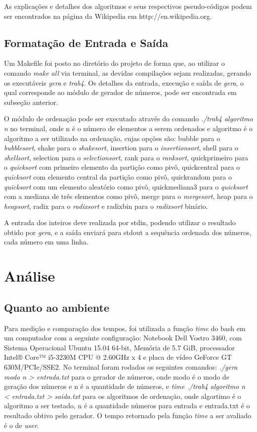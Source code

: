\documentclass[
	article,			%
	11pt,				%
	oneside,			%
	a4paper,			%
	english,			%
	brazil,				%
	sumario=tradicional
	]{abntex2}
\begin{document}
As explicações e detalhes dos algoritmos e seus respectivos pseudo-códigos podem ser encontrados na página da Wikipedia em http://en.wikipedia.org.

\subsection{Formatação de Entrada e Saída}

Um Makefile foi posto no diretório do projeto de forma que, ao utilizar o comando \emph{make all} via terminal, as devidas compilações sejam realizadas, gerando os executáveis \emph{gera} e \emph{trab4}. Os detalhes da entrada, execução e saída de \emph{gera}, o qual corresponde ao módulo de gerador de números, pode ser encontrada em subseção anterior.

O módulo de ordenação pode ser executado através do comando \emph{./trab4 algoritmo n} no terminal, onde n é o número de elementos a serem ordenados e algoritmo é o algoritmo a ser utilizado na ordenação, cujas opções são: bubble para o \emph{bubblesort}, shake para o \emph{shakesort}, insertion para o \emph{insertionsort}, shell para o \emph{shellsort}, selection para o \emph{selectionsort}, rank para o \emph{ranksort}, quickprimeiro para o \emph{quicksort} com primeiro elemento da partição como pivô, quickcentral para o \emph{quicksort} com elemento central da partição como pivô, quickrandom para o \emph{quicksort} com um elemento aleatório como pivô, quickmediana3 para o \emph{quicksort} com a mediana de três elementos como pivô, merge para o \emph{mergesort}, heap para o \emph{heapsort}, radix para o \emph{radixsort} e radixbin para o \emph{radixsort} binário.

A entrada dos inteiros deve realizada por stdin, podendo utilizar o resultado obtido por \emph{gera}, e a saída enviará para stdout a sequência ordenada dos números, cada número em uma linha.

\section{Análise}

\subsection{Quanto ao ambiente}

Para medição e comparação dos tempos, foi utilizada a função \emph{time} do bash em um computador com a seguinte configuração: Notebook Dell Vostro 3460, com Sistema Operacional Ubuntu 15.04 64-bit, Memória de 5.7 GiB, processador Intel® Core™ i5-3230M CPU @ 2.60GHz x 4 e placa de vídeo GeForce GT 630M/PCIe/SSE2. No terminal foram rodados os seguintes comandos: \emph{./gera modo n > entrada.txt} para o gerador de números, onde modo é o modo de geração dos números e n é a quantidade de números, e \emph{time ./trab4 algoritmo n < entrada.txt > saida.txt} para os algoritmos de ordenação, onde algortimo é o algoritmo a ser testado, n é a quantidade números para entrada e entrada.txt é o resultado obtivo pelo gerador. O tempo retornado pela função \emph{time} a ser avaliado é o de \emph{user}.
\end{document}
